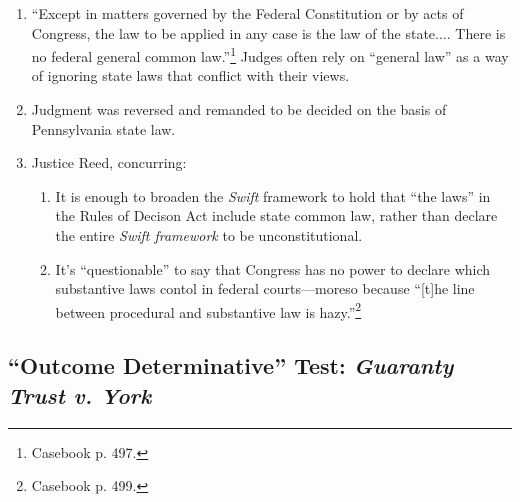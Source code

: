 \begin{enumerate}
\begin{enumerate}
        reincorporating in other states in order to establish diversity 
        jurisdiction to have their cases tried in federal court (\emph{Black 
        \& White Taxicab}). ``\emph{Swift v. Tyson} introduced grave 
        discrimination by noncitizens against citizens.''\footnote{Casebook p. 
        496.}
        \item Third: The federal government did not have the power to 
        legislate rules of tort or contract law. (This quickly became untrue 
        as the Court expanded the federal government's power to regulate these 
        areas under the Commerce Clause). Federal courts also do not have the 
        power to create rules in these areas.
    \end{enumerate}
    \item ``Except in matters governed by the Federal Constitution or by acts 
    of Congress, the law to be applied in any case is the law of the state.... 
    There is no federal general common law.''\footnote{Casebook p. 497.} 
    Judges often rely on ``general law'' as a way of ignoring state laws that 
    conflict with their views.
    \item Judgment was reversed and remanded to be decided on the basis of 
    Pennsylvania state law.
    \item Justice Reed, concurring:
    \begin{enumerate}
        \item It is enough to broaden the \emph{Swift} framework to hold that 
        ``the laws'' in the Rules of Decison Act include state common law, 
        rather than declare the entire \emph{Swift framework} to be 
        unconstitutional.
        \item It's ``questionable'' to say that Congress has no power to 
        declare which substantive laws contol in federal courts---moreso 
        because ``[t]he line between procedural and substantive law is 
        hazy.''\footnote{Casebook p. 499.}
    \end{enumerate}
\end{enumerate}

\subsection{``Outcome Determinative'' Test: \emph{Guaranty Trust v. York}}


